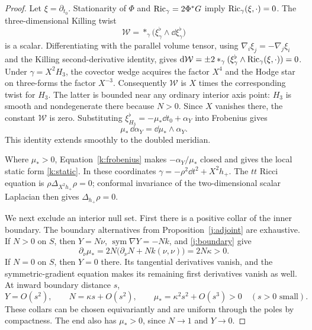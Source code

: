 \begin{proof}
Let \(\xi=\partial_{t_0}\). Stationarity of \(\Phi\) and
\(\operatorname{Ric}_\gamma=2\Phi^*G\) imply \(\operatorname{Ric}_\gamma(\xi,\cdot)=0\).
The three-dimensional Killing twist
\[
 \mathcal W=*_\gamma
     \bigl(\xi^\flat_\gamma\wedge\dd\xi^\flat_\gamma\bigr)
\]
is a scalar. Differentiating with the parallel volume tensor, using
\(\nabla_i\xi_j=-\nabla_j\xi_i\) and the Killing second-derivative
identity, gives
\(\mathrm d\mathcal W=\pm2*_\gamma
(\xi^\flat_\gamma\wedge\operatorname{Ric}_\gamma(\xi,\cdot))=0\).
Under \(\gamma=X^2H_3\), the covector wedge acquires the factor \(X^4\)
and the Hodge star on three-forms the factor \(X^{-3}\). Consequently
\(\mathcal W\) is \(X\) times the corresponding twist for \(H_3\).
The latter is bounded near any ordinary interior axis point:
\(H_3\) is smooth and nondegenerate there because \(N>0\).
Since \(X\) vanishes there, the constant \(\mathcal W\) is zero.
Substituting \(\xi^\flat_{H_3}=-\mu_*\dd t_0+\alpha_Y\) into
Frobenius gives
\begin{equation}\label{k:frobenius}
 \mu_*\,\dd\alpha_Y=\dd\mu_*\wedge\alpha_Y .
\end{equation}
This identity extends smoothly to the doubled meridian.

Where \(\mu_*>0\), Equation~\eqref{k:frobenius} makes
\(-\alpha_Y/\mu_*\) closed and gives the local static form
\eqref{k:static}. In these coordinates
\(\gamma=-\rho^2\dd t^2+X^2h_+\).
The \(tt\) Ricci equation is
\(\rho\Delta_{X^2h_+}\rho=0\); conformal invariance of the
two-dimensional scalar Laplacian then gives
\(\Delta_{h_+}\rho=0\).

We next exclude an interior null set. First there is a positive
collar of the inner boundary. The boundary alternatives from
Proposition~\ref{j:adjoint} are exhaustive. If \(N>0\) on \(S\), then
\(Y=N\nu\), \(\operatorname{sym}\nabla Y=-Nk\), and
\eqref{j:boundary} give
\[
 \partial_\nu\mu_*
 =2N\bigl(\partial_\nu N+Nk(\nu,\nu)\bigr)
 =2N\kappa>0.
\]
If \(N=0\) on \(S\), then \(Y=0\) there. Its tangential derivatives
vanish, and the symmetric-gradient equation makes its remaining
first derivatives vanish as well. At inward boundary distance \(s\),
\[
 Y=O(s^2),\qquad N=\kappa s+O(s^2),\qquad
 \mu_*=\kappa^2s^2+O(s^3)>0\quad(s>0\text{ small}).
\]
These collars can be chosen equivariantly and are uniform through
the poles by compactness. The end also has \(\mu_*>0\), since
\(N\to1\) and \(Y\to0\).


\end{proof}
